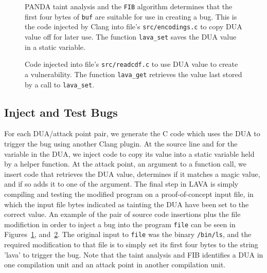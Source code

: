 \begin{figure}

\caption{PANDA taint analysis and the \texttt{FIB} algorithm determines that the first four bytes of \texttt{buf} are suitable for use in creating a bug.
This is the code injected by Clang into file's \texttt{src/encodings.c} to copy DUA value off for later use.
The function \texttt{lava\_set} saves the DUA value in a static variable.}
\label{src:dua-siphon}
\end{figure}

\begin{figure}

\caption{Code injected into file's \texttt{src/readcdf.c} to use DUA value to create a vulnerability.
The function \texttt{lava\_get} retrieves the value last stored by a call to  \texttt{lava\_set}.}
\label{src:dua-use}
\end{figure}

\subsection{Inject and Test Bugs}
For each DUA/attack point pair, we generate the C code which uses the DUA to trigger the bug using another Clang plugin.
At the source line and for the variable in the DUA, we inject code to copy its value into a static variable held by a helper function.
At the attack point, an argument to a function call, we insert code that retrieves the DUA value, determines if it matches a magic value, and if so adds it to one of the argument.
The final step in LAVA is simply compiling and testing the modified program on a proof-of-concept input file, in which the input file bytes indicated as tainting the DUA have been set to the correct value.
An example of the pair of source code insertions plus the file modifiction in order to inject a bug into the program \verb+file+ can be seen in Figures~\ref{src:dua-siphon}, and~\ref{src:dua-use}.
The original input to \verb+file+ was the binary \verb+/bin/ls+, and the required modification to that file is to simply set its first four bytes to the string 'lava' to trigger the bug. 
Note that the taint analysis and FIB identifies a DUA in one compilation unit and an attack point in another compilation unit.  

